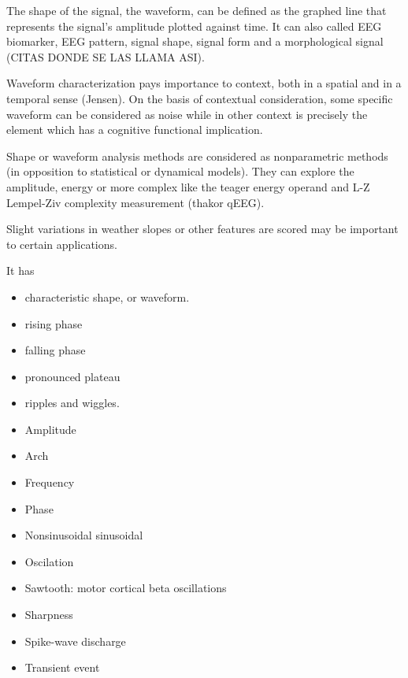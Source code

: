 \documentclass[sensors,article,submit,moreauthors,pdftex,10pt,a4paper]{mdpi}
\begin{document}
The shape of the signal, the waveform, can be defined as the graphed line that represents the signal's amplitude plotted against time. It can  also called EEG biomarker,  EEG pattern, signal shape, signal form and a morphological signal (CITAS DONDE SE LAS LLAMA ASI).

Waveform characterization pays importance to context, both in a spatial and in a temporal sense (Jensen).  On the basis of contextual consideration, some specific waveform can be considered as noise while in other context is precisely the element which has a cognitive functional implication.



Shape or waveform analysis methods are considered as nonparametric methods (in opposition to statistical or dynamical models).  They can explore the amplitude, energy or more complex like the teager energy operand and L-Z Lempel-Ziv complexity measurement (thakor qEEG).


%

Slight variations in weather slopes or other features are scored may be important to certain applications.

It has
\begin{itemize}
\item characteristic shape, or waveform.
\item rising phase
\item falling phase
\item pronounced plateau
\item ripples and wiggles. 
\end{itemize}

\begin{itemize}
\item Amplitude
\item Arch
\item Frequency
\item Phase
\item Nonsinusoidal sinusoidal
\item Oscilation
\item Sawtooth: motor cortical beta oscillations
\item Sharpness
\item Spike-wave discharge
\item Transient event
\end{itemize}
\end{document}

